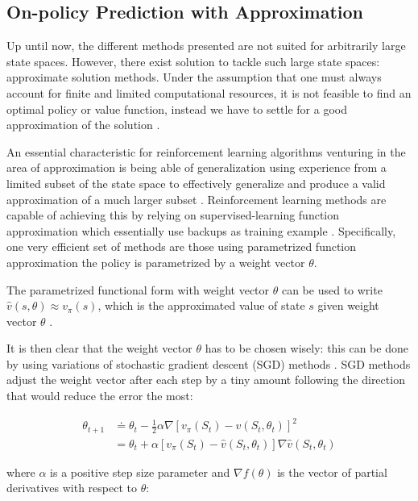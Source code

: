 \documentclass{seal_thesis}
\begin{document}
\subsection{On-policy Prediction with Approximation}
\label{subsec:onpol_pred}

Up until now, the different methods presented are not suited for arbitrarily large state spaces. However, there exist solution to tackle such large state spaces: approximate solution methods. Under the assumption that one must always account for finite and limited computational resources, it is not feasible to find an optimal policy or value function, instead we have to settle for a good approximation of the solution \cite[p. 189]{Sutton2017}.

An essential characteristic for reinforcement learning algorithms venturing in the area of approximation is being able of generalization \ie using experience from a limited subset of the state space to effectively generalize and produce a valid approximation of a much larger subset  \cite[p. 189]{Sutton2017}. Reinforcement learning methods are capable of achieving this by relying on supervised-learning function approximation which essentially use backups as training example \cite[p. 222]{Sutton2017}. Specifically, one very efficient set of methods are those using parametrized function approximation \ie the policy is parametrized by a weight vector $\theta$.

The parametrized functional form with weight vector $\theta$ can be used to write $\hat{v}(s,\theta) \approx v_\pi (s)$, which is the approximated value of state $s$ given weight vector $\theta$ \cite[p. 191]{Sutton2017}.

It is then clear that the weight vector $\theta$ has to be chosen wisely: this can be done by using variations of stochastic gradient descent (SGD) methods \cite[p. 223]{Sutton2017}. SGD methods adjust the weight vector after each step by a tiny amount following the direction that would reduce the error the most:

\begin{align}
	\theta_{t+1} &\doteq \theta_t - \frac{1}{2} \alpha \nabla [v_\pi (S_t) - \hat{v} (S_t,\theta_t)]^2\\
	&= \theta_t + \alpha  [v_\pi (S_t) - \hat{v} (S_t,\theta_t)] \nabla \hat{v} (S_t,\theta_t)
\end{align}

where $\alpha$ is a positive step size parameter and $\nabla f(\theta)$ is the vector of partial derivatives with respect to $\theta$:
\end{document}
